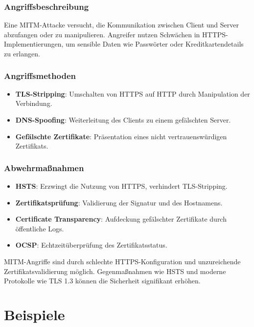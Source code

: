 \documentclass{article}
\begin{document}
\subsubsection{Angriffsbeschreibung}
Eine MITM-Attacke versucht, die Kommunikation zwischen Client und Server abzufangen oder zu manipulieren. Angreifer nutzen Schwächen in HTTPS-Implementierungen, um sensible Daten wie Passwörter oder Kreditkartendetails zu erlangen.

\subsubsection{Angriffsmethoden}
\begin{itemize}
\item \textbf{TLS-Stripping}: Umschalten von HTTPS auf HTTP durch Manipulation der Verbindung.
\item \textbf{DNS-Spoofing}: Weiterleitung des Clients zu einem gefälschten Server.
\item \textbf{Gefälschte Zertifikate}: Präsentation eines nicht vertrauenswürdigen Zertifikats.
\end{itemize}

\subsubsection{Abwehrmaßnahmen}
\begin{itemize}
\item \textbf{HSTS}: Erzwingt die Nutzung von HTTPS, verhindert TLS-Stripping.
\item \textbf{Zertifikatsprüfung}: Validierung der Signatur und des Hostnamens.
\item \textbf{Certificate Transparency}: Aufdeckung gefälschter Zertifikate durch öffentliche Logs.
\item \textbf{OCSP}: Echtzeitüberprüfung des Zertifikatsstatus.
\end{itemize}

MITM-Angriffe sind durch schlechte HTTPS-Konfiguration und unzureichende Zertifikatsvalidierung möglich. Gegenmaßnahmen wie HSTS und moderne Protokolle wie TLS 1.3 können die Sicherheit signifikant erhöhen.


\section{Beispiele}
\end{document}
